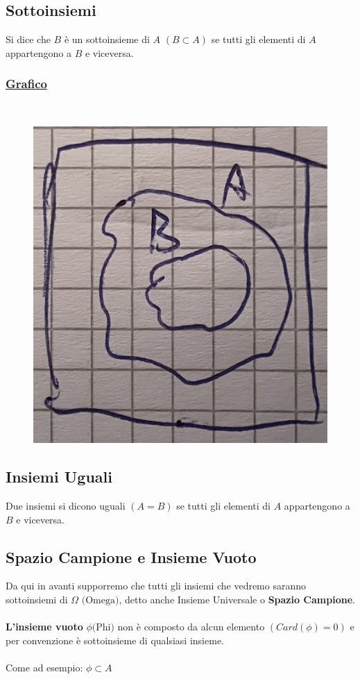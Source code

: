\documentclass{article}
\begin{document}
\subsection{Sottoinsiemi}
Si dice che $B$ è un sottoinsieme di $A$ $\left( B \subset A\right)$ se tutti gli elementi di $A$ appartengono a $B$ e viceversa.
\subsubsection{\underline{Grafico}} ~\\
\begin{figure}[ht]
\centering
\includegraphics[scale=0.10]{images/14.VennSotto.jpeg}
\end{figure} 
\subsection{Insiemi Uguali}
Due insiemi si dicono uguali $\left( A = B \right)$ se tutti gli elementi di $A$ appartengono a $B$ e viceversa.

\subsection{Spazio Campione e Insieme Vuoto}
Da qui in avanti supporremo che tutti gli insiemi che vedremo saranno sottoinsiemi di $\Omega \text{ (Omega)}$, detto anche Insieme Universale o \textbf{Spazio Campione}. \\ \\
\textbf{L'insieme vuoto} $\phi \text{(Phi)}$ non è composto da alcun elemento $\left( Card(\phi) = 0\right)$ e per convenzione è sottoinsieme di qualsiasi insieme. \\ \\
Come ad esempio: $\phi \subset A$
\end{document}
